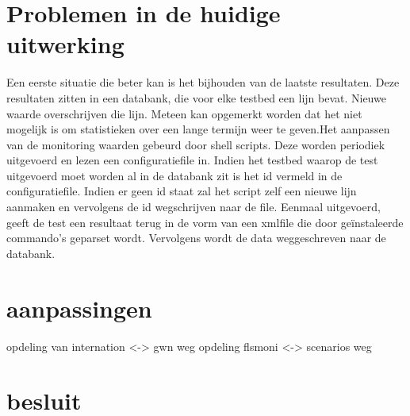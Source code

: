\section{Problemen in de huidige uitwerking}
\npar
Een eerste situatie die beter kan is het bijhouden van de laatste resultaten.
Deze resultaten zitten in een databank, die voor elke testbed een lijn bevat. Nieuwe waarde overschrijven die lijn. Meteen kan opgemerkt worden dat het niet mogelijk is om statistieken over een lange termijn weer te geven.Het aanpassen van de monitoring waarden gebeurd door shell scripts. Deze worden periodiek uitgevoerd en lezen een configuratiefile in. Indien het testbed waarop de test uitgevoerd moet worden al in de databank zit is het id vermeld in de configuratiefile. Indien er geen id staat zal het script zelf een nieuwe lijn aanmaken en vervolgens de id wegschrijven naar de file. Eenmaal uitgevoerd, geeft de test een resultaat terug in de vorm van een xmlfile die door ge\"instaleerde commando\rq s geparset wordt. Vervolgens wordt de data weggeschreven naar de databank.
\npar


\section{aanpassingen}
opdeling van internation <-> gwn weg
opdeling flsmoni <-> scenarios weg

\section{besluit}